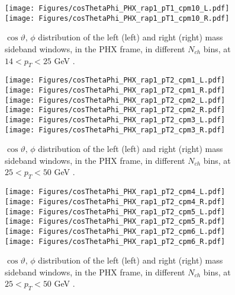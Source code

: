 \documentclass[12pt]{article}
\begin{document}
\begin{figure}[htbp]
\centering
\texttt{[image: Figures/cosThetaPhi\_PHX\_rap1\_pT1\_cpm10\_L.pdf]}
\texttt{[image: Figures/cosThetaPhi\_PHX\_rap1\_pT1\_cpm10\_R.pdf]}
\caption{$\cos\vartheta,\,\phi$ distribution of the left (left) and
  right (right) mass sideband windows, in the PHX frame, in different
  $N_{ch}$ bins, at $14 < p_{T} < 25$ GeV .}
\end{figure}
\clearpage

\begin{figure}[htbp]
\centering
\texttt{[image: Figures/cosThetaPhi\_PHX\_rap1\_pT2\_cpm1\_L.pdf]}
\texttt{[image: Figures/cosThetaPhi\_PHX\_rap1\_pT2\_cpm1\_R.pdf]}
\texttt{[image: Figures/cosThetaPhi\_PHX\_rap1\_pT2\_cpm2\_L.pdf]}
\texttt{[image: Figures/cosThetaPhi\_PHX\_rap1\_pT2\_cpm2\_R.pdf]}
\texttt{[image: Figures/cosThetaPhi\_PHX\_rap1\_pT2\_cpm3\_L.pdf]}
\texttt{[image: Figures/cosThetaPhi\_PHX\_rap1\_pT2\_cpm3\_R.pdf]}
\caption{$\cos\vartheta,\,\phi$ distribution of the left (left) and
  right (right) mass sideband windows, in the PHX frame, in different
  $N_{ch}$ bins, at $25 < p_{T} < 50$ GeV .}
\end{figure}
\clearpage

\begin{figure}[htbp]
\centering
\texttt{[image: Figures/cosThetaPhi\_PHX\_rap1\_pT2\_cpm4\_L.pdf]}
\texttt{[image: Figures/cosThetaPhi\_PHX\_rap1\_pT2\_cpm4\_R.pdf]}
\texttt{[image: Figures/cosThetaPhi\_PHX\_rap1\_pT2\_cpm5\_L.pdf]}
\texttt{[image: Figures/cosThetaPhi\_PHX\_rap1\_pT2\_cpm5\_R.pdf]}
\texttt{[image: Figures/cosThetaPhi\_PHX\_rap1\_pT2\_cpm6\_L.pdf]}
\texttt{[image: Figures/cosThetaPhi\_PHX\_rap1\_pT2\_cpm6\_R.pdf]}
\caption{$\cos\vartheta,\,\phi$ distribution of the left (left) and
  right (right) mass sideband windows, in the PHX frame, in different
  $N_{ch}$ bins, at $25 < p_{T} < 50$ GeV .}
\end{figure}
\clearpage
\end{document}
